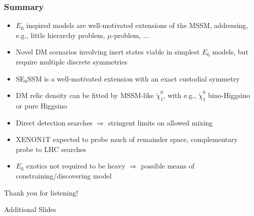 \documentclass[10pt,aspectratio=169]{beamer}
\begin{document}
\begin{frame}
  \frametitle{Summary}
  \begin{itemize} \itemsep1em
  \item $E_6$ inspired models are well-motivated extensions of the MSSM,
    addressing, e.g., little hierarchy problem, $\mu$-problem, $\ldots$
  \item Novel DM scenarios involving inert states viable in simplest $E_6$
    models, but require multiple discrete symmetries
  \item SE$_6$SSM is a well-motivated extension with an exact custodial
    symmetry
  \item DM relic density can be fitted by MSSM-like $\tilde{\chi}_1^0$, with
    e.g., $\tilde{\chi}_1^0$ bino-Higgsino or pure Higgsino
  \item Direct detection searches $\Rightarrow$ \alert{stringent limits on
    allowed mixing}
  \item XENON1T expected to probe much of remainder space, {\color{blue}
    complementary probe to LHC searches}
  \item {\color{blue} $E_6$ exotics not required to be heavy
    $\Rightarrow$ possible means of constraining/discovering model}
  \end{itemize}
  \begin{center}
    \large Thank you for listening!
  \end{center}
\end{frame}

\appendix

\begin{frame}
  \begin{center}
    {
      \Large
      Additional Slides
    }
  \end{center}
\end{frame}
\end{document}
